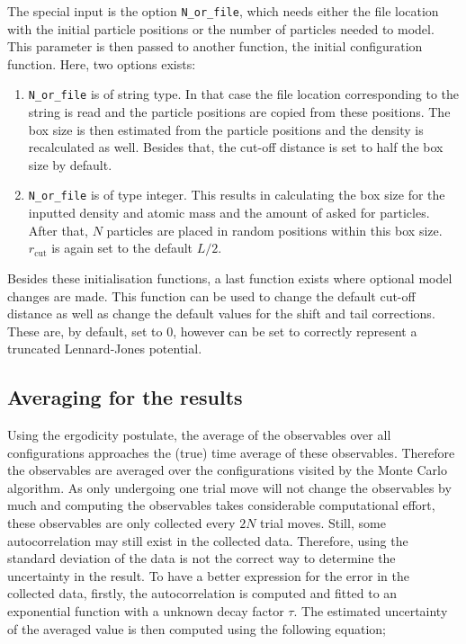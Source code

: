 The special input is the option \texttt{N_or_file}, which needs either the file location with the initial particle positions or the number of particles needed to model. This parameter is then passed to another function, the initial configuration function. Here, two options exists:
\begin{enumerate}
	\item \texttt{N_or_file} is of string type. In that case the file location corresponding to the string is read and the particle positions are copied from these positions. The box size is then estimated from the particle positions and the density is recalculated as well. Besides that, the cut-off distance is set to half the box size by default.
	\item \texttt{N_or_file} is of type integer. This results in calculating the box size for the inputted density and atomic mass and the amount of asked for particles. After that, $N$ particles are placed in random positions within this box size. $r_\text{cut}$ is again set to the default $L/2$. 
\end{enumerate}

Besides these initialisation functions, a last function exists where optional model changes are made. This function can be used to change the default cut-off distance as well as change the default values for the shift and tail corrections. These are, by default, set to $0$, however can be set to correctly represent a truncated Lennard-Jones potential.

\subsection{Averaging for the results}
Using the ergodicity postulate, the average of the observables over all configurations approaches the (true) time average of these observables. Therefore the observables are averaged over the configurations visited by the Monte Carlo algorithm. As only undergoing one trial move will not change the observables by much and computing the observables takes considerable computational effort, these observables are only collected every $2N$ trial moves. Still, some autocorrelation may still exist in the collected data. Therefore, using the standard deviation of the data is not the correct way to determine the uncertainty in the result. To have a better expression for the error in the collected data, firstly, the autocorrelation is computed and fitted to an exponential function with a unknown decay factor $\tau$. The estimated uncertainty of the averaged value is then computed using the following equation;

